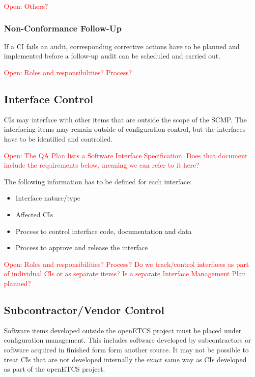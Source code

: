 \documentclass{template/openetcs_article}
\begin{document}
\textcolor{red}{Open: Others?}


\subsubsection{Non-Conformance Follow-Up} %
\label{sec:Non-Conformance Follow-Up}

If a CI fails an audit, corresponding corrective actions have to be planned and implemented before a follow-up audit can be scheduled and carried out. 

\textcolor{red}{Open: Roles and responsibilities? Process?}


\subsection{Interface Control} %
\label{sec:Interface Control}

CIs may interface with other items that are outside the scope of the SCMP. The interfacing items may remain outside of configuration control, but the interfaces have to be identified and controlled.

\textcolor{red}{Open: The QA Plan lists a Software Interface Specification. Does that document include the requirements below, meaning we can refer to it here?}

The following information has to be defined for each interface:

\vspace{-10pt}
\begin{itemize}
\item Interface nature/type
\item Affected CIs
\item Process to control interface code, documentation and data
\item Process to approve and release the interface
\end{itemize}

\textcolor{red}{Open: Roles and responsibilities? Process? Do we track/control interfaces as part of individual CIs or as separate items? Is a separate Interface Management Plan planned?}


\subsection{Subcontractor/Vendor Control} %
\label{sec:Subcontractor/Vendor Control}

Software items developed outside the openETCS project must be placed under configuration management. This includes software developed by subcontractors or software acquired in finished form form another source. It may not be possible to treat CIs that are not developed internally the exact same way as CIs developed as part of the openETCS project.
\end{document}
